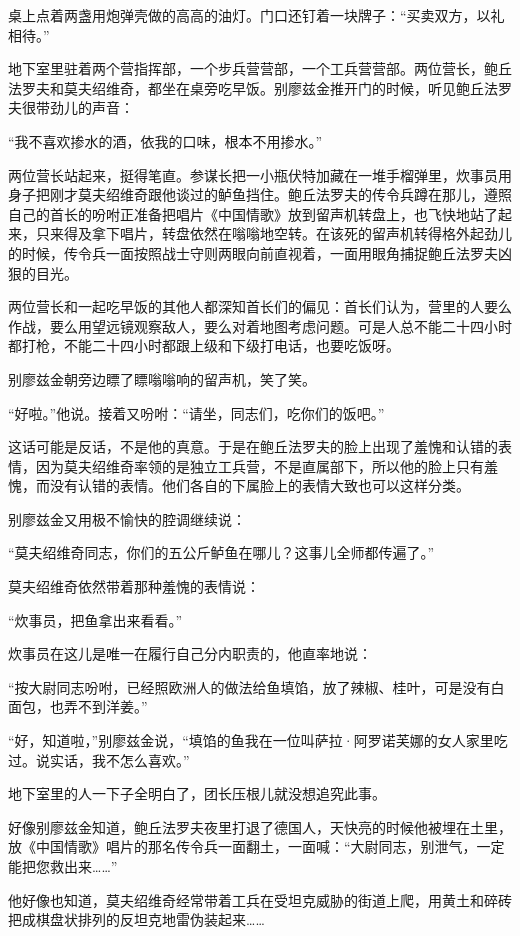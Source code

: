桌上点着两盏用炮弹壳做的高高的油灯。门口还钉着一块牌子：“买卖双方，以礼相待。”

地下室里驻着两个营指挥部，一个步兵营营部，一个工兵营营部。两位营长，鲍丘法罗夫和莫夫绍维奇，都坐在桌旁吃早饭。别廖兹金推开门的时候，听见鲍丘法罗夫很带劲儿的声音：

“我不喜欢掺水的酒，依我的口味，根本不用掺水。”

两位营长站起来，挺得笔直。参谋长把一小瓶伏特加藏在一堆手榴弹里，炊事员用身子把刚才莫夫绍维奇跟他谈过的鲈鱼挡住。鲍丘法罗夫的传令兵蹲在那儿，遵照自己的首长的吩咐正准备把唱片《中国情歌》放到留声机转盘上，也飞快地站了起来，只来得及拿下唱片，转盘依然在嗡嗡地空转。在该死的留声机转得格外起劲儿的时候，传令兵一面按照战士守则两眼向前直视着，一面用眼角捕捉鲍丘法罗夫凶狠的目光。

两位营长和一起吃早饭的其他人都深知首长们的偏见：首长们认为，营里的人要么作战，要么用望远镜观察敌人，要么对着地图考虑问题。可是人总不能二十四小时都打枪，不能二十四小时都跟上级和下级打电话，也要吃饭呀。

别廖兹金朝旁边瞟了瞟嗡嗡响的留声机，笑了笑。

“好啦。”他说。接着又吩咐：“请坐，同志们，吃你们的饭吧。”

这话可能是反话，不是他的真意。于是在鲍丘法罗夫的脸上出现了羞愧和认错的表情，因为莫夫绍维奇率领的是独立工兵营，不是直属部下，所以他的脸上只有羞愧，而没有认错的表情。他们各自的下属脸上的表情大致也可以这样分类。

别廖兹金又用极不愉快的腔调继续说：

“莫夫绍维奇同志，你们的五公斤鲈鱼在哪儿？这事儿全师都传遍了。”

莫夫绍维奇依然带着那种羞愧的表情说：

“炊事员，把鱼拿出来看看。”

炊事员在这儿是唯一在履行自己分内职责的，他直率地说：

“按大尉同志吩咐，已经照欧洲人的做法给鱼填馅，放了辣椒、桂叶，可是没有白面包，也弄不到洋姜。”

“好，知道啦，”别廖兹金说，“填馅的鱼我在一位叫萨拉·阿罗诺芙娜的女人家里吃过。说实话，我不怎么喜欢。”

地下室里的人一下子全明白了，团长压根儿就没想追究此事。

好像别廖兹金知道，鲍丘法罗夫夜里打退了德国人，天快亮的时候他被埋在土里，放《中国情歌》唱片的那名传令兵一面翻土，一面喊：“大尉同志，别泄气，一定能把您救出来……”

他好像也知道，莫夫绍维奇经常带着工兵在受坦克威胁的街道上爬，用黄土和碎砖把成棋盘状排列的反坦克地雷伪装起来……

